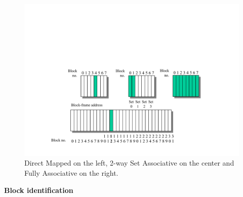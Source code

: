 \begin{figure}[!htp]
    \centering
    \includegraphics[width=\textwidth]{img/n-way-set-associative-cache-2.pdf}
    \caption*{Direct Mapped on the left, 2-way Set Associative on the center and Fully Associative on the right.}
\end{figure}

\newpage

\begin{center}
    \large
    \label{Block identification}
    \hypertarget{Block identification}{\textcolor{Red2}{\textbf{Block identification}}}
\end{center}

